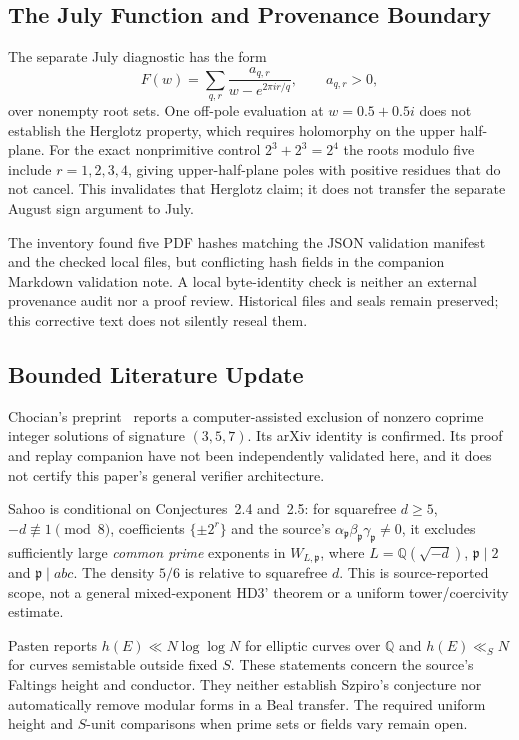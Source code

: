 \documentclass[11pt,a4paper]{article}
\begin{document}
\subsection{The July Function and Provenance Boundary}
The separate July diagnostic has the form
\[
 F(w)=\sum_{q,r}\frac{a_{q,r}}{w-e^{2\pi i r/q}},
 \qquad a_{q,r}>0,
\]
over nonempty root sets. One off-pole evaluation at
$w=0.5+0.5i$ does not establish the Herglotz property, which requires
holomorphy on the upper half-plane.
For the exact nonprimitive control $2^3+2^3=2^4$ the roots modulo
five include $r=1,2,3,4$, giving upper-half-plane poles with positive
residues that do not cancel. This invalidates that Herglotz claim;
it does not transfer the separate August sign argument to July.

The inventory found five PDF hashes matching the JSON validation
manifest and the checked local files, but conflicting hash fields
in the companion Markdown validation note. A local byte-identity
check is neither an external provenance audit nor a proof review.
Historical files and seals remain preserved; this corrective text
does not silently reseal them.

\subsection{Bounded Literature Update}
Chocian's preprint~\cite{Chocian2026} reports a computer-assisted
exclusion of nonzero coprime integer solutions of signature
$(3,5,7)$. Its arXiv identity is confirmed. Its proof and replay
companion have not been independently validated here, and it does
not certify this paper's general verifier architecture.

Sahoo \cite[Theorem~1.10, Proposition~1.12]{Sahoo2026} is conditional
on Conjectures~2.4 and~2.5: for squarefree $d\ge5$,
$-d\not\equiv1\pmod8$, coefficients $\{\pm2^r\}$ and the source's
$\alpha_{\mathfrak p}\beta_{\mathfrak p}\gamma_{\mathfrak p}\ne0$,
it excludes sufficiently large \emph{common prime} exponents in
$W_{L,\mathfrak p}$, where $L=\mathbb Q(\sqrt{-d})$,
$\mathfrak p\mid2$ and $\mathfrak p\mid abc$.
The density $5/6$ is relative to squarefree $d$.
This is source-reported scope, not a general mixed-exponent HD3'
theorem or a uniform tower/coercivity estimate.

Pasten \cite[Corollaries~1.2--1.3]{Pasten2026} reports
$h(E)\ll N\log\log N$ for elliptic curves over $\mathbb Q$ and
$h(E)\ll_S N$ for curves semistable outside fixed $S$.
These statements concern the source's Faltings height and conductor.
They neither establish Szpiro's conjecture nor automatically remove
modular forms in a Beal transfer. The required uniform height and
$S$-unit comparisons when prime sets or fields vary remain open.
\end{document}
